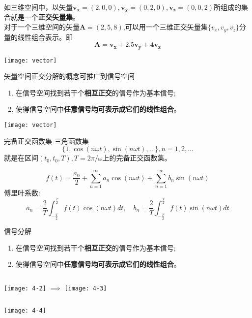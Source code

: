 \begin{frame}
\begin{example}
如三维空间中，以矢量$\bm{v_x}=(2,0,0),\bm{v_y}=(0,2,0),\bm{v_z}=(0,0,2)$所组成的集合就是一个\textbf{正交矢量集}。\\
对于一个三维空间的矢量$\bm{A}=(2,5,8)$,可以用一个三维正交矢量集$\{v_x,v_y,v_z\}$分量的线性组合表示。即
\[\bm{A=v_x+2.5v_y+4v_z} \]
\end{example}
\centering
\texttt{[image: vector]}
\end{frame}

\begin{frame}{矢量空间正交分解的概念可推广到信号空间}
\begin{enumerate}
	\setlength{\itemsep}{.3cm}
	\item 在信号空间找到若干个\textbf{相互正交}的信号作为基本信号; 
	\item 使得信号空间中\textbf{任意信号均可表示成它们的线性组合}。
\end{enumerate}
\centering
\texttt{[image: vector]}
\end{frame}

\begin{frame}{完备正交函数集}
三角函数集
\[ \{1,\cos(n\omega t),\sin(n\omega t),\dots\},n=1,2,\dots \]
就是在区间$(t_0,t_0,T),T=2\pi/\omega$上的完备正交函数集。
\begin{example}[傅里叶级数的三角形式]
\[ f(t)=\frac{a_0}{2}+\sum\limits_{n=1}^{\infty}a_n\cos(n\omega t)+\sum\limits_{n=1}^{\infty}b_n\sin(n\omega t)\]
傅里叶系数: 
\[ a_n=\frac{2}{T}\int_{-\frac{T}{2}}^{\frac{T}{2}}f(t)\cos(n\omega t)dt,\quad b_n=\frac{2}{T}\int_{-\frac{T}{2}}^{\frac{T}{2}}f(t)\sin(n\omega t)dt \]
\end{example}
\end{frame}

\begin{frame}{信号分解}
\begin{enumerate}
	\setlength{\itemsep}{.2cm}
	\item 在信号空间找到若干个\textbf{相互正交}的信号作为基本信号; 
	\item 使得信号空间中\textbf{任意信号均可表示成它们的线性组合}。
\end{enumerate}
\begin{columns}
	\texttt{[image: 4-2]}
	\hspace{1cm}$\implies$
	\texttt{[image: 4-3]}
\end{columns}
\texttt{[image: 4-4]}
\end{frame}

